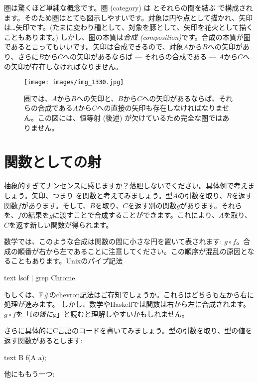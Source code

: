 
\lettrine[lhang=0.17]{圏}{は}驚くほど単純な概念です。圏 (category) は とそれらの間を結ぶ で構成されます。そのため圏はとても図示しやすいです。対象は円や点として描かれ、矢印は\ldots{}矢印です。(たまに変わり種として、対象を豚として、矢印を花火として描くこともあります。) しかし、圏の本質は\emph{合成 (composition)}です。合成の本質が圏であると言ってもいいです。矢印は合成できるので、対象$A$から$B$への矢印があり、さらに$B$から$C$への矢印があるならば --- それらの合成である --- $A$から$C$への矢印が存在しなければなりません。

\begin{figure}
  \centering
  \texttt{[image: images/img\_1330.jpg]}
  \caption{圏では、$A$から$B$への矢印と、$B$から$C$への矢印があるならば、それらの合成である$A$から$C$への直接の矢印も存在しなければなりません。この図には、恒等射 (後述) が欠けているため完全な圏ではありません。}
\end{figure}

\section{関数としての射}

抽象的すぎてナンセンスに感じますか？落胆しないでください。具体例で考えましょう。矢印、つまり を関数と考えてみましょう。型$A$の引数を取り、$B$を返す関数$f$があります。そして、$B$を取り、$C$を返す別の関数$g$があります。それらを、$f$の結果を$g$に渡すことで合成することができます。これにより、$A$を取り、$C$を返す新しい関数が得られます。

数学では、このような合成は関数の間に小さな円を置いて表されます: $g \circ f$。合成の順番が右から左であることに注意してください。この順序が混乱の原因となることもあります。Unixのパイプ記法
\begin{snip}{text}
lsof | grep Chrome
\end{snip}
もしくは、F\#のchevron記法\code{>>}はご存知でしょうか。これらはどちらも左から右に処理が進みます。
しかし、数学やHaskellでは関数は右から左に合成されます。$g \circ f$を「f\emph{の後に}g」と読むと理解しやすいかもしれません。

さらに具体的にC言語のコードを書いてみましょう。型の引数を取り、型の値を返す関数があるとします:

\begin{snip}{text}
B f(A a);
\end{snip}
他にももう一つ:

